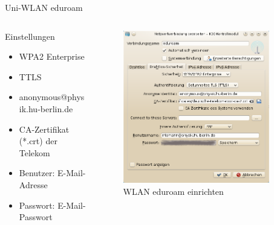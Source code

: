 \begin{frame}{Uni-WLAN eduroam}
  \begin{columns}
    \begin{column}{0.5\textwidth}
      Einstellungen
      \begin{itemize}
        \item WPA2 Enterprise
        \item TTLS
        \item anonymous@physik.hu-berlin.de
        \item CA-Zertifikat (*.crt) der Telekom
        \item Benutzer: E-Mail-Adresse
        \item Passwort: E-Mail-Passwort
      \end{itemize}
    \end{column}
    \begin{column}{0.5\textwidth}
      \begin{figure}
        \includegraphics[keepaspectratio=true,width=0.9\textwidth]{eduroam}
        \caption{WLAN eduroam einrichten}
      \end{figure}
    \end{column}
  \end{columns}
\end{frame}


